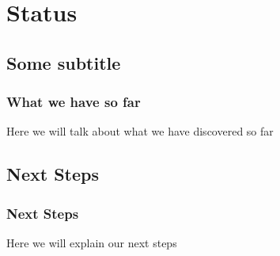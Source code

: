\section{Status}
\subsection{Some subtitle}
\frame
{
\frametitle{What we have so far}
\begin{block}{}
Here we will talk about what we have discovered so far
\end{block}
}

\subsection{Next Steps}
\frame
{
\frametitle{Next Steps}
\begin{block}{}
Here we will explain our next steps
\end{block}
}